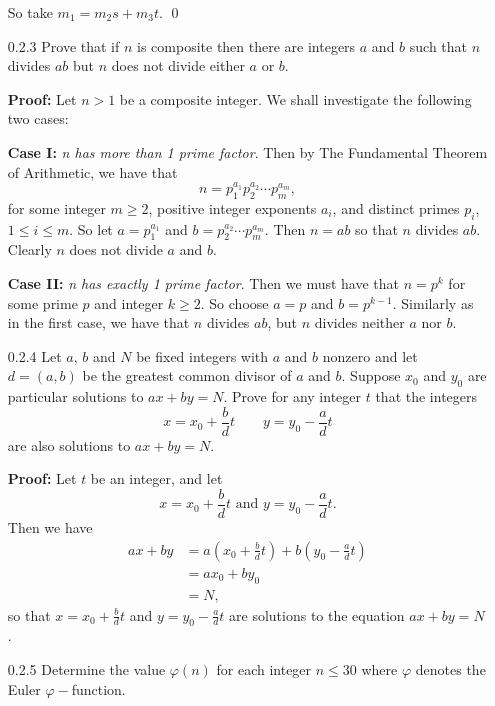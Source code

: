 \begin{enumerate}
      So take $m_1 = m_2s + m_3t$. \qed
   \item[0.2.3]   Prove that if $n$ is composite then there are integers $a$ and
                  $b$ such that $n$ divides $ab$ but $n$ does not divide either
                  $a$ or $b$.

      \textbf{Proof:} Let $n > 1$ be a composite integer. We shall 
      investigate the following two cases:

      \textbf{Case I:} \textit{n has more than 1 prime factor}. Then by The 
      Fundamental Theorem of Arithmetic, we have that
      $$n = p_1^{a_1}p_2^{a_2} \cdots p_m^{a_m},$$
      for some integer $m \ge 2$, positive integer exponents $a_i$, and distinct
      primes $p_i$, $1 \le i \le m$. So let $a = p_1^{a_1}$ and
      $b = p_2^{a_2} \cdots p_m^{a_m}$. Then $n = ab$ so that $n$ divides $ab$.
      Clearly $n$ does not divide $a$ and $b$.

      \textbf{Case II:} \textit{n has exactly 1 prime factor}. Then we must
      have that $n = p^{k}$ for some prime $p$ and integer $k \ge 2$. So choose
      $a = p$ and $b = p^{k - 1}$. Similarly as in the first case, we have that
      $n$ divides $ab$, but $n$ divides neither $a$ nor $b$.
   \item[0.2.4]   Let $a$, $b$ and $N$ be fixed integers with $a$ and $b$ 
                  nonzero and let $d = (a, b)$ be the greatest common divisor of
                  $a$ and $b$. Suppose $x_0$ and $y_0$ are particular solutions
                  to $ax + by = N$. Prove for any integer $t$ that the integers
                  $$x = x_0 + \frac{b}{d}t \qquad y = y_0 - \frac{a}{d}t$$
                  are also solutions to $ax + by = N$.

      \textbf{Proof:} Let $t$ be an integer, and let
		$$x = x_0 + \frac{b}{d}t \text{ and } y = y_0 - \frac{a}{d}t.$$
		Then we have
		\begin{align*}
			ax + by &= a\left(x_0 + \frac{b}{d}t\right) +
						  b\left(y_0 - \frac{a}{d}t\right) \\
					  &= ax_0 + by_0 \\
					  &= N,					  
		\end{align*}
		so that $x = x_0 + \frac{b}{d}t$ and $y = y_0 - \frac{a}{d}t$ are
		solutions to the equation $ax + by = N$.
   \item[0.2.5]   Determine the value $\varphi(n)$ for each integer $n \le 30$
                  where $\varphi$ denotes the Euler $\varphi-$function.  


\end{enumerate}

